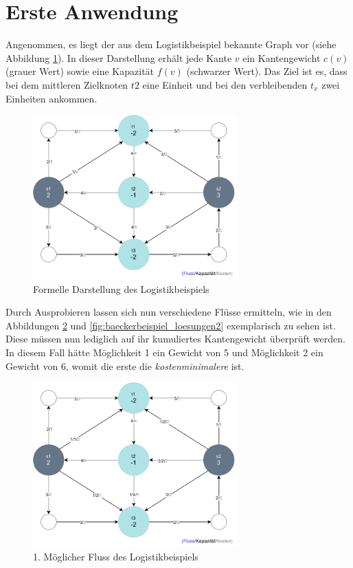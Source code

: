 \section{Erste Anwendung}
Angenommen, es liegt der aus dem Logistikbeispiel bekannte Graph vor (siehe Abbildung \ref{fig:baeckerbeispiel2}). In dieser Darstellung erhält jede Kante $v$ ein Kantengewicht $c(v)$ (grauer Wert) sowie eine Kapazität $f(v)$ (schwarzer Wert). Das Ziel ist es, dass bei dem mittleren Zielknoten $t2$ eine Einheit und bei den verbleibenden $t_x$ zwei Einheiten ankommen.

\begin{figure}[ht]
\centering
\includegraphics[width=0.7\textwidth]{img/philipp/graph1-example0.drawio.pdf}
\caption{Formelle Darstellung des Logistikbeispiels}
\label{fig:baeckerbeispiel2}
\end{figure}

Durch Ausprobieren lassen sich nun verschiedene Flüsse ermitteln, wie in den Abbildungen \ref{fig:baeckerbeispiel_loesungen1} und \ref{fig:baeckerbeispiel_loesungen2} exemplarisch zu sehen ist. Diese müssen nun lediglich auf ihr kumuliertes Kantengewicht überprüft werden. In diesem Fall hätte Möglichkeit 1 ein Gewicht von 5 und Möglichkeit 2 ein Gewicht von 6, womit die erste die \textit{kostenminimalere} ist.

\begin{figure}[htb]
\centering
\includegraphics[width=0.7\textwidth]{img/philipp/graph1-example1.drawio.pdf}
\caption{1. Möglicher Fluss des Logistikbeispiels}
\label{fig:baeckerbeispiel_loesungen1}
\end{figure}


